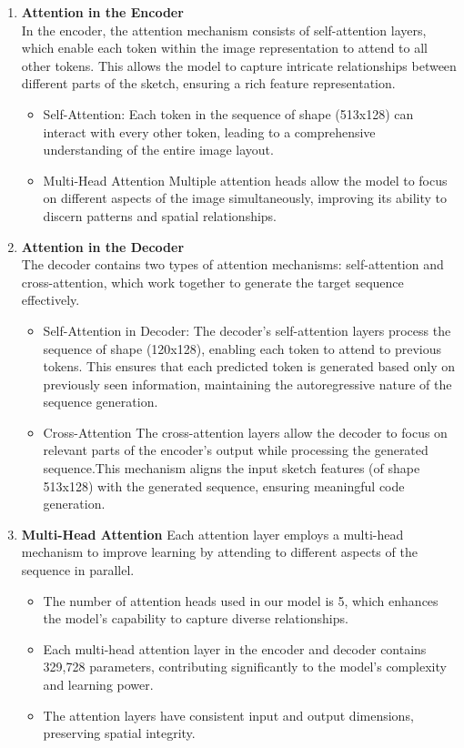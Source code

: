 \begin{enumerate}[label=\textbf{\roman*})]
    \item \textbf{Attention in the Encoder}\\
    In the encoder, the attention mechanism consists of self-attention layers, which enable each token within the image representation to attend to all other tokens. This allows the model to capture intricate relationships between different parts of the sketch, ensuring a rich feature representation.
    \begin{itemize}
        \item Self-Attention:
        Each token in the sequence of shape (513x128) can interact with every other token, leading to a comprehensive understanding of the entire image layout.
        \item Multi-Head Attention
        Multiple attention heads allow the model to focus on different aspects of the image simultaneously, improving its ability to discern patterns and spatial relationships.
    \end{itemize}
    
    \item \textbf{Attention in the Decoder}\\
    The decoder contains two types of attention mechanisms: self-attention and cross-attention, which work together to generate the target sequence effectively.
    \begin{itemize}
        \item Self-Attention in Decoder:
        The decoder's self-attention layers process the sequence of shape (120x128), enabling each token to attend to previous tokens. This ensures that each predicted token is generated based only on previously seen information, maintaining the autoregressive nature of the sequence generation.
        \item Cross-Attention
        The cross-attention layers allow the decoder to focus on relevant parts of the encoder's output while processing the generated sequence.This mechanism aligns the input sketch features (of shape 513x128) with the generated sequence, ensuring meaningful code generation.
    \end{itemize}
    
    \item \textbf{Multi-Head Attention}
    Each attention layer employs a multi-head mechanism to improve learning by attending to different aspects of the sequence in parallel.
    \begin{itemize}
        \item The number of attention heads used in our model is 5, which enhances the model’s capability to capture diverse relationships.
        \item Each multi-head attention layer in the encoder and decoder contains 329,728 parameters, contributing significantly to the model's complexity and learning power.
        \item The attention layers have consistent input and output dimensions, preserving spatial integrity.
    \end{itemize}
    \end{enumerate}

